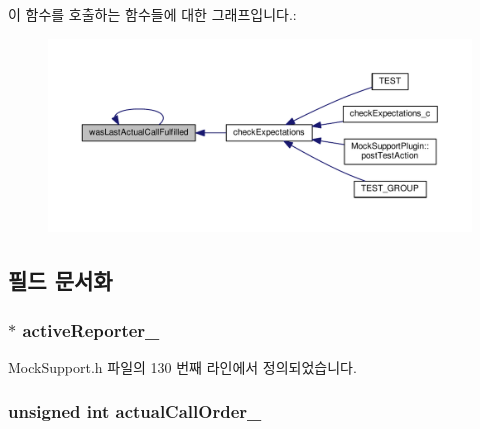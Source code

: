 이 함수를 호출하는 함수들에 대한 그래프입니다.\+:
\nopagebreak
\begin{figure}[H]
\begin{center}
\leavevmode
\includegraphics[width=350pt]{class_mock_support_acd935c1e39f057e15d9d266481f2b1e1_icgraph}
\end{center}
\end{figure}




\subsection{필드 문서화}
\subsubsection[{\texorpdfstring{active\+Reporter\+\_\+}{activeReporter_}}]{$\ast$ active\+Reporter\+\_\+\hspace{0.3cm}{\ttfamily [private]}}\hypertarget{class_mock_support_a75833f9457ebccff4c6e8b55529313fb}{}\label{class_mock_support_a75833f9457ebccff4c6e8b55529313fb}


Mock\+Support.\+h 파일의 130 번째 라인에서 정의되었습니다.

\subsubsection[{\texorpdfstring{actual\+Call\+Order\+\_\+}{actualCallOrder_}}]{\setlength{\rightskip}{0pt plus 5cm}unsigned int actual\+Call\+Order\+\_\+\hspace{0.3cm}{\ttfamily [private]}}\hypertarget{class_mock_support_a58e873078e053e6b06ad68a8a7e0c313}{}\label{class_mock_support_a58e873078e053e6b06ad68a8a7e0c313}


